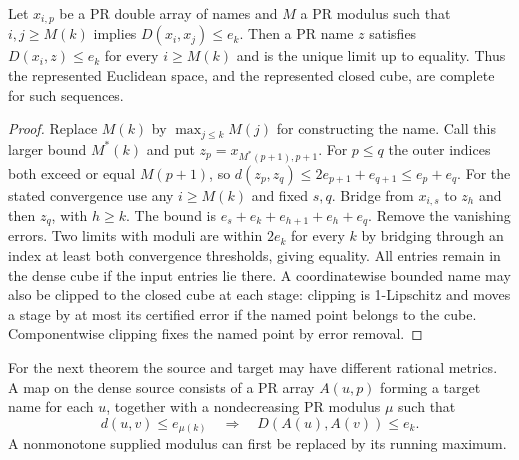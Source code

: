 \begin{theorem}\label{idx-metric91}
Let $x_{i,p}$ be a PR double array of names and $M$ a PR modulus such that
$i,j\ge M(k)$ implies $D(x_i,x_j)\le e_k$. Then a PR name $z$ satisfies
$D(x_i,z)\le e_k$ for every $i\ge M(k)$ and is the unique limit up to
equality. Thus the represented Euclidean space, and the represented closed
cube, are complete for such sequences.
\end{theorem}
\begin{proof}
Replace $M(k)$ by $\max_{j\le k}M(j)$ for constructing the name. Call this
larger bound $M^*(k)$ and put $z_p=x_{M^*(p+1),p+1}$. For $p\le q$ the
outer indices both exceed or equal $M(p+1)$, so
$d(z_p,z_q)\le 2e_{p+1}+e_{q+1}\le e_p+e_q$. For the stated convergence
use any $i\ge M(k)$ and fixed $s,q$. Bridge from $x_{i,s}$ to $z_h$ and
then $z_q$, with $h\ge k$. The bound is
$e_s+e_k+e_{h+1}+e_h+e_q$. Remove the vanishing errors.
Two limits with moduli are within $2e_k$ for every $k$ by bridging through
an index at least both convergence thresholds, giving equality.
All entries remain in the dense cube if the input entries lie there. A
coordinatewise bounded name may also be clipped to the closed cube at each stage:
clipping is 1-Lipschitz and moves a stage by at most its certified error if
the named point belongs to the cube. Componentwise clipping fixes the named
point by error removal.
\end{proof}

For the next theorem the source and target may have different rational
metrics. A map on the dense source consists of a PR array $A(u,p)$ forming a
target name for each $u$, together with a nondecreasing PR modulus $\mu$ such
that
\[
 d(u,v)\le e_{\mu(k)}\quad\Longrightarrow\quad D(A(u),A(v))\le e_k .
\]
A nonmonotone supplied modulus can first be replaced by its running maximum.

